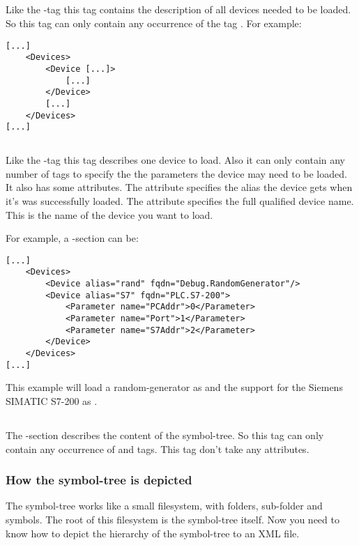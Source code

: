 \subsection{}
Like the -tag this tag contains the description of
all devices needed to be loaded. So this tag can only contain any
occurrence of the tag . For example:
\begin{verbatim}
[...]
    <Devices>
        <Device [...]>
            [...]
        </Device>
        [...]
    </Devices>
[...]
\end{verbatim}


\subsection{}
Like the -tag this tag describes one device to load. Also it can only contain 
any number of  tags to specify the the parameters the device may need to be
loaded. It also has some attributes. The attribute  specifies the alias the device 
gets when it's was successfully loaded. The attribute  specifies the full qualified 
device name. This is the name of the device you want to load.

For example, a -section can be:
\begin{verbatim}
[...]
    <Devices>
        <Device alias="rand" fqdn="Debug.RandomGenerator"/>
        <Device alias="S7" fqdn="PLC.S7-200">
            <Parameter name="PCAddr">0</Parameter>
            <Parameter name="Port">1</Parameter>
            <Parameter name="S7Addr">2</Parameter>
        </Device>
    </Devices>
[...]
\end{verbatim}
This example will load a random-generator as   and the support for the Siemens SIMATIC S7-200 
as .


\subsection{}
The -section describes the content of the symbol-tree. So this tag can only contain
any occurrence of  and  tags. This tag don't take any attributes.

\subsubsection{How the symbol-tree is depicted}
The symbol-tree works like a small filesystem, with folders, sub-folder and symbols. The root of this filesystem is the
symbol-tree itself. Now you need to know how to depict the hierarchy of the symbol-tree to an XML file.

